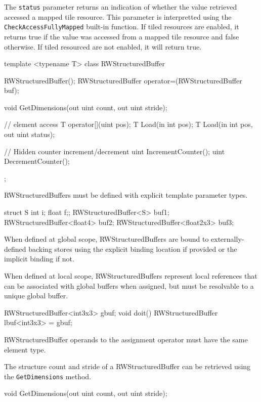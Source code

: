 The \texttt{status} parameter returns an indication of whether the value retrieved accessed a mapped tile
resource. This parameter is interpretted using the \texttt{CheckAccessFullyMapped}
built-in function. If tiled resources are enabled, it returns true if the value was accessed from a mapped
tile resource and false otherwise. If tiled resourced are not enabled, it will return true.


\begin{HLSL}
template <typename T>
 class RWStructuredBuffer {
   RWStructuredBuffer();
   RWStructuredBuffer operator=(RWStructuredBuffer buf);

   void GetDimensions(out uint count, out uint stride);

   // element access
   T operator[](uint pos);
   T Load(in int pos);
   T Load(in int pos, out uint status);

   // Hidden counter increment/decrement
   uint IncrementCounter();
   uint DecrementCounter();

};
\end{HLSL}


RWStructuredBuffers must be defined with explicit template parameter types.
\begin{HLSL}
  struct S {int i; float f;};
  RWStructuredBuffer<S> buf1;
  RWStructuredBuffer<float4> buf2;
  RWStructuredBuffer<float2x3> buf3;
\end{HLSL}

When defined at global scope, RWStructuredBuffers are bound to externally-defined backing stores
using the explicit binding location if provided or the implicit binding if not.

When defined at local scope, RWStructuredBuffers represent local references
that can be associated with global buffers when assigned,
but must be resolvable to a unique global buffer.

\begin{HLSL}
  RWStructuredBuffer<int3x3> gbuf;
  void doit() {
    RWStructuredBuffer lbuf<int3x3> = gbuf;
  }
\end{HLSL}
RWStructuredBuffer operands to the assignment operator must have the same element type.


The structure count and stride of a RWStructuredBuffer can be retrieved using the \texttt{GetDimensions} method.
\begin{HLSL}
void GetDimensions(out uint count, out uint stride);
\end{HLSL}

